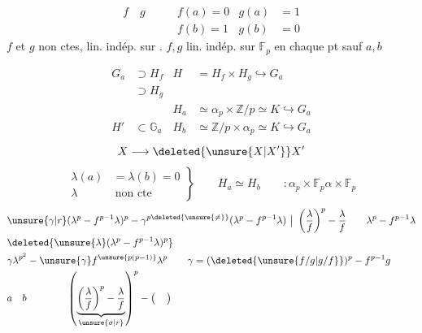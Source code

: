 \[
 \begin{aligned}
 f\quad g\qquad &f(a)=0&g(a)&=1\\
 &f(b)=1&g(b)&=0
 \end{aligned}
\]
$f$ et $g$  non ctes,  lin. indép. sur .
 $f,g$ lin. indép. sur $\mathbb F_p$ en chaque pt sauf $a,b$

\[
 \begin{aligned}
 G_a&\supset H_f& H&=H_f\times H_g\hookrightarrow G_a\\
 &\supset H_g\\
 &&H_a&\simeq\alpha_p\times\mathbb Z/p\simeq K\hookrightarrow G_a\\
 H'&\subset\mathbb G_a&H_b&\simeq\mathbb Z/p\times\alpha_p\simeq K\hookrightarrow G_a
 \end{aligned}
\]
\[
 X\longrightarrow\deleted{\unsure{X|X'}}X'
\]
\[
 \left.\begin{aligned}
 \lambda(a)&=\lambda(b)=0\\
 \lambda&\ \text{non cte}
 \end{aligned}\right\}
 \qquad H_a\simeq H_b\qquad :\alpha_p\times\mathbb F_p\alpha\times\mathbb F_p
\]
\[
 \begin{aligned}
 &\unsure{\gamma|r}(\lambda^p-f^{p-1}\lambda)^p-\gamma^{p\deleted{\unsure{\ne}}}(\lambda^p-f^{p-1}\lambda)
 \ \big|\ \left(\frac{\lambda}{f}\right)^p-\frac{\lambda}{f}\qquad\lambda^p-f^{p-1}\lambda\\
 &\deleted{\unsure{\lambda}(\lambda^p-f^{p-1}\lambda)^p}\\
 &\gamma\lambda^{p^2}-\unsure{\gamma}f^{\unsure{p(p-1)}}\lambda^p
 \qquad\gamma=(\deleted{\unsure{f/g|g/f}})^{p}-f^{p-1}g\\
 &a\quad b\qquad\qquad
 \left(\underbrace{\left(\frac{\lambda}{f}\right)^p-\frac{\lambda}{f}}_{\unsure{\sigma|r}}\right)^{p}
 -\big(\hphantom{xx}\big)
 \end{aligned}
\]
